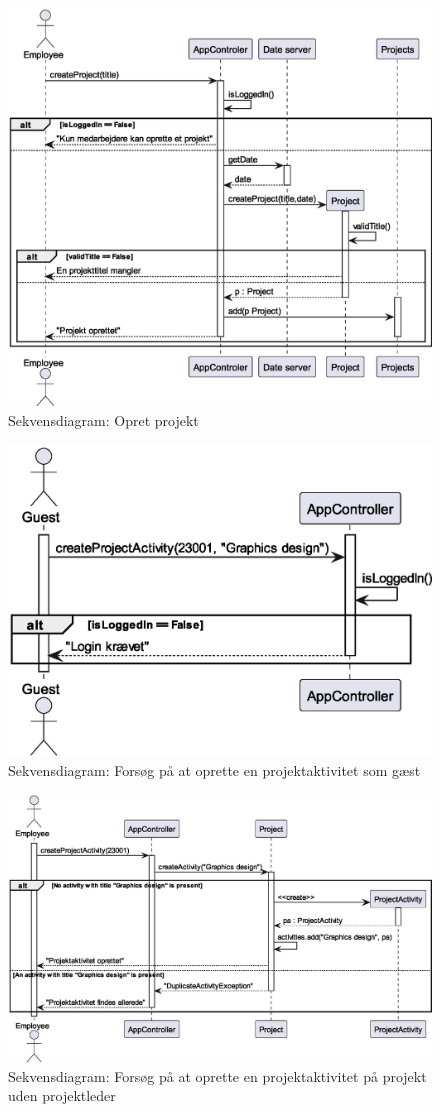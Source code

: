 \begin{figure}[H]
    \centering
    \caption{Sekvensdiagram: Opret projekt}\label{fig:sequence_create_project}
    \includegraphics[width = .75\textwidth]{Diagrams/CreateProject.eps}
\end{figure}
\begin{figure}[H]
    \centering
    \caption{Sekvensdiagram: Forsøg på at oprette en projektaktivitet som gæst}\label{fig:sequence_create_PA_guest}
    \includegraphics[width = .5\textwidth]{Diagrams/createActivityNoPLGuest.eps}
\end{figure}
\begin{figure}[H]
    \centering
    \caption{Sekvensdiagram: Forsøg på at oprette en projektaktivitet på projekt uden projektleder}\label{fig:sequence_create_PA_no_PL_1}
    \includegraphics[width = .75\textwidth]{Diagrams/createActivityNoPLCase1.eps}
\end{figure}
